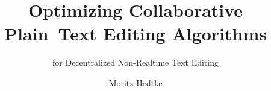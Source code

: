 \documentclass[
	english,
	ruledheaders=section,
	class=report,
	thesis={type=bachelor},
	accentcolor=9c,
	custommargins=true,
	marginpar=false,
	parskip=half-,
	fontsize=11pt,
    listof=totoc
]{tudapub}
\begin{document}
\title{Optimizing Collaborative Plain~Text Editing Algorithms}
\subtitle{for Decentralized Non-Realtime Text Editing}
\author{Moritz Hedtke}


\submissiondate{\today}
\examdate{\today}


\maketitle
\affidavit

\tableofcontents

\newlength{\imagea}
\newlength{\imageb}

\newcommand{\twoMinipageFigures}[4]{
    \settoheight{\imagea}{\texttt{[image: \#1]}}
    \settoheight{\imageb}{\texttt{[image: \#3]}}

    \ifdim\imagea>\imageb
        \begin{figure}
            \begin{minipage}[t]{.4875\textwidth}
                \sbox0{\texttt{[image: \#1]}}
                \texttt{[image: \#1]}
                #2
            \end{minipage}
            \hfill
            \begin{minipage}[t]{.4875\textwidth}
                \texttt{[image: \#3]}
                \vphantom{\texttt{[image: \#1]}}
                #4
            \end{minipage}
        \end{figure}
    \else
        \begin{figure}
            \begin{minipage}[t]{.4875\textwidth}
                \sbox0{\texttt{[image: \#3]}}
                \texttt{[image: \#1]}
                \vphantom{\texttt{[image: \#3]}}
                #2
            \end{minipage}
            \hfill
            \begin{minipage}[t]{.4875\textwidth}
                \texttt{[image: \#3]}
                #4
            \end{minipage}
        \end{figure}
    \fi
}
\end{document}
